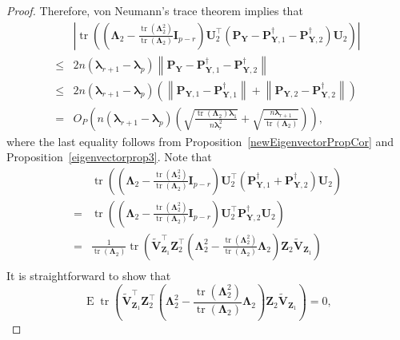 \documentclass[12pt]{article} %
\DeclareMathOperator{\mytr}{tr}
\DeclareMathOperator{\myE}{E}
\newcommand{\bZ}{\mathbf{Z}}
\newcommand{\bP}{\mathbf{P}}
\newcommand{\bY}{\mathbf{Y}}
\newcommand{\bI}{\mathbf{I}}
\newcommand{\bU}{\mathbf{U}}
\newcommand{\bV}{\mathbf{V}}
\newcommand{\bfsym}[1]{\ensuremath{\boldsymbol{#1}}}
\def\blambda {\bfsym {\lambda}}
\def\bLambda {\bfsym {\Lambda}}
\theoremstyle{definition}
\begin{document}
\begin{appendices}
\begin{proof}
       Therefore, von Neumann's trace theorem implies that
       \begin{equation}\label{jojo1}
           \begin{split}
    &\left|
        \mytr\left(
            \left(\bLambda_2-\frac{\mytr(\bLambda_2^2)}{\mytr(\bLambda_2)}\bI_{p-r}\right) \bU_2^\top \left(\bP_{\bY}-\bP_{\bY,1}^\dagger-\bP_{\bY,2}^\dagger\right) \bU_2 
    \right)
    \right|
    \\
    \leq & 2n (\blambda_{r+1} -\blambda_p)\left\|\bP_{\bY}-\bP_{\bY,1}^\dagger-\bP_{\bY,2}^\dagger\right\|
    \\
    \leq & 2n (\blambda_{r+1} -\blambda_p)\left(
        \left\|\bP_{\bY,1}-\bP_{\bY,1}^\dagger\right\|
        +\left\|\bP_{\bY,2}-\bP_{\bY,2}^\dagger
        \right\|
    \right)
    \\
    =&
    O_P\left(n(\blambda_{r+1}-\blambda_p)\left(\sqrt{\frac{\mytr(\bLambda_2)\blambda_1}{n\blambda_r^2}}+\sqrt{\frac{n\blambda_{r+1}}{\mytr(\bLambda_2)}}\right)\right),
           \end{split}
       \end{equation}
       where the last equality follows from Proposition~\ref{newEigenvectorPropCor} and Proposition~\ref{eigenvectorprop3}.
       Note that
       \begin{equation*}
           \begin{split}
        &
        \mytr\left(
            \left(\bLambda_2-\frac{\mytr(\bLambda_2^2)}{\mytr(\bLambda_2)}\bI_{p-r}\right) \bU_2^\top \left(\bP_{\bY,1}^\dagger+\bP_{\bY,2}^\dagger\right) \bU_2 
    \right)
    \\
        =&
        \mytr\left(
            \left(\bLambda_2-\frac{\mytr(\bLambda_2^2)}{\mytr(\bLambda_2)}\bI_{p-r}\right) \bU_2^\top \bP_{\bY,2}^\dagger \bU_2 
    \right)
    \\
    =&
    \frac{1}{\mytr(\bLambda_2)} 
    \mytr\left(\tilde{\bV}_{\bZ_1}^\top \bZ_2^\top 
 \left(
       \bLambda_2^2 
    -\frac{\mytr(\bLambda_2^2)}{\mytr(\bLambda_2)}\bLambda_2
 \right)
\bZ_2 \tilde{\bV}_{\bZ_1}\right)
    \\
           \end{split}
       \end{equation*}
       It is straightforward to show that
       \begin{equation*}
    \myE \mytr\left(\tilde{\bV}_{\bZ_1}^\top \bZ_2^\top 
 \left(
       \bLambda_2^2 
    -\frac{\mytr(\bLambda_2^2)}{\mytr(\bLambda_2)}\bLambda_2
 \right)
\bZ_2 \tilde{\bV}_{\bZ_1}\right)
=0,
       \end{equation*}

\end{proof}
\end{appendices}
\end{document}
